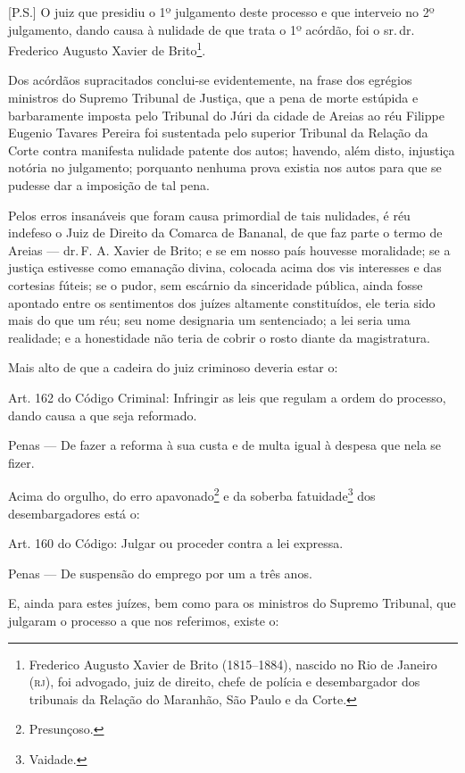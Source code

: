 {[}P.S.{]} O juiz que presidiu o 1º julgamento deste processo e que
interveio no 2º julgamento, dando causa à nulidade de que trata o 1º
acórdão, foi o sr.\,dr.\,Frederico Augusto Xavier de Brito\footnote{
  Frederico Augusto Xavier de Brito (1815--1884), nascido no Rio de
  Janeiro (\textsc{rj}), foi advogado, juiz de direito, chefe de polícia e
  desembargador dos tribunais da Relação do Maranhão, São Paulo e da
  Corte.}.

Dos acórdãos supracitados conclui-se evidentemente, na frase dos
egrégios ministros do Supremo Tribunal de Justiça, que a pena de morte
estúpida e barbaramente imposta pelo Tribunal do Júri da cidade de
Areias ao réu Filippe Eugenio Tavares Pereira foi sustentada pelo
superior Tribunal da Relação da Corte contra manifesta nulidade patente
dos autos; havendo, além disto, injustiça notória no julgamento;
porquanto nenhuma prova existia nos autos para que se pudesse dar a
imposição de tal pena.

Pelos erros insanáveis que foram causa primordial de tais nulidades, é
réu indefeso o Juiz de Direito da Comarca de Bananal, de que faz parte o
termo de Areias --- dr.\,F. A. Xavier de Brito; e se em nosso país
houvesse moralidade; se a justiça estivesse como emanação divina,
colocada acima dos vis interesses e das cortesias fúteis; se o pudor,
sem escárnio da sinceridade pública, ainda fosse apontado entre os
sentimentos dos juízes altamente constituídos, ele teria sido mais do
que um réu; seu nome designaria um sentenciado; a lei seria uma
realidade; e a honestidade não teria de cobrir o rosto diante da
magistratura.

Mais alto de que a cadeira do juiz criminoso deveria estar o:

Art. 162 do Código Criminal: Infringir as leis que regulam a ordem do
processo, dando causa a que seja reformado.

Penas --- De fazer a reforma à sua custa e de multa igual à despesa que
nela se fizer.

Acima do orgulho, do erro apavonado\footnote{Presunçoso.} e da soberba
fatuidade\footnote{Vaidade.} dos desembargadores está o:

Art. 160 do Código: Julgar ou proceder contra a lei expressa.

Penas --- De suspensão do emprego por um a três anos.

E, ainda para estes juízes, bem como para os ministros do Supremo
Tribunal, que julgaram o processo a que nos referimos, existe o:


